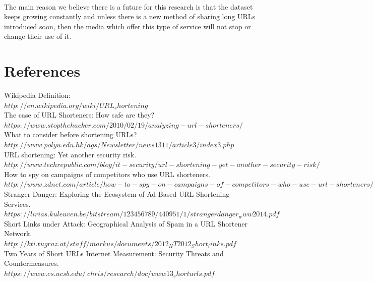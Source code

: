 \documentclass[12pt]{article}
\begin{document}
\paragraph{}
The main reason we believe there is a future for this research is that the dataset keeps growing constantly and unless there is a new method of sharing long URLs introduced soon, then the media which offer this type of service will not stop or change their use of it.
\newpage
\section{References}


Wikipedia Definition:\\
$http://en.wikipedia.org/wiki/URL_shortening$
\\

The case of URL Shorteners: How safe are they?\\
$https://www.stopthehacker.com/2010/02/19/analyzing-url-shorteners/$
\\

What to consider before shortening URLs?\\
$http://www.polyu.edu.hk/ags/Newsletter/news1311/article3/index3.php$
\\

URL shortening: Yet another security risk.\\
$http://www.techrepublic.com/blog/it-security/url-shortening-yet-another-security-risk/$
\\

How to spy on campaigns of competitors who use URL shorteners.\\
$http://www.zdnet.com/article/how-to-spy-on-campaigns-of-competitors-who-use-url-shorteners/$
\\

Stranger Danger: Exploring the Ecosystem of Ad-Based URL Shortening Services.\\
$https://lirias.kuleuven.be/bitstream/123456789/440951/1/strangerdanger_www2014.pdf$
\\

Short Links under Attack: Geographical Analysis of Spam in a URL Shortener Network.\\
$http://kti.tugraz.at/staff/markus/documents/2012_HT2012_Short_links.pdf$
\\

Two Years of Short URLs Internet Measurement: Security Threats and Countermeasures.\\
$https://www.cs.ucsb.edu/~chris/research/doc/www13_shorturls.pdf$
\\
\end{document}
